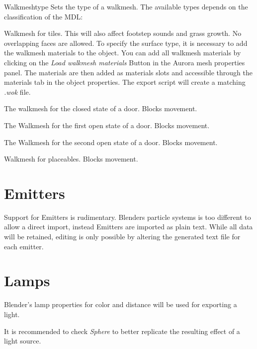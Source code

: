 \begin{propertyAurora}{Walkmeshtype} 
Sets the type of a walkmesh. The available types depends on the classification of the MDL:
\begin{description}[leftmargin=10em,style=nextline]
    \item[Tileset] Walkmesh for tiles. This will also affect footstep sounds and grass growth. No overlapping faces are allowed. To specify the surface type, it is necessary to add the walkmesh materials to the object. You can add all walkmesh materials by clicking on the {\textit{Load walkmesh materials}} Button in the Aurora mesh properties panel. The materials are then added as materials slots and accessible through the materials tab in the object properties.
    The export script will create a matching {\textit{.wok}} file. 
    \item[Door: Closed] The walkmesh for the closed state of a door. Blocks movement.
    \item[Door: Open 1] The Walkmesh for the first open state of a door. Blocks movement.
    \item[Door: Open 2] The Walkmesh for the second open state of a door. Blocks movement.
    \item[Placeable] Walkmesh for placeables. Blocks movement.
\end{description}
\end{propertyAurora}

\section{Emitters}
Support for Emitters is rudimentary. Blenders particle systems is too
different to allow a direct import, instead Emitters are imported as plain
text. While all data will be retained, editing is only possible by altering the 
generated text file for each emitter.

\section{Lamps}
Blender's lamp properties for color and distance will be used for exporting a light.

It is recommended to check \textit{Sphere} to better replicate the resulting effect 
of a light source.

